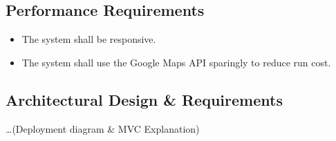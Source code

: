 \documentclass{article}
\begin{document}
    \subsection{Performance Requirements}
    \begin{itemize}
        \item
            The system shall be responsive.
        \item
            The system shall use the Google Maps API sparingly to reduce run
            cost.
    \end{itemize}

    \subsection{Architectural Design \& Requirements}
    \ldots (Deployment diagram \& MVC Explanation)
\end{document}
